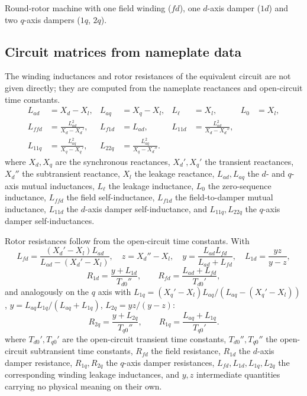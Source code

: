 \documentclass[11pt]{article}
\begin{document}
Round-rotor machine with one field winding ($fd$), one $d$-axis damper
($1d$) and two $q$-axis dampers ($1q$, $2q$).

\subsection{Circuit matrices from nameplate data}

The winding inductances and rotor resistances of the equivalent circuit are
not given directly; they are computed from the nameplate reactances and
open-circuit time constants.
\begin{align}
  L_{ad} &= X_d - X_l, & L_{aq} &= X_q - X_l, & L_\ell &= X_l, & L_0 &= X_l,\\
  L_{ffd} &= \frac{L_{ad}^2}{X_d - X_d'}, & L_{f1d} &= L_{ad}, &
  L_{11d} &= \frac{L_{ad}^2}{X_d - X_d''}, \\
  L_{11q} &= \frac{L_{aq}^2}{X_q - X_q'}, & L_{22q} &= \frac{L_{aq}^2}{X_q - X_d''}.
\end{align}
where $X_d,X_q$ are the synchronous reactances, $X_d',X_q'$ the transient
reactances, $X_d''$ the subtransient reactance, $X_l$ the leakage
reactance, $L_{ad},L_{aq}$ the $d$- and $q$-axis mutual inductances,
$L_\ell$ the leakage inductance, $L_0$ the zero-sequence inductance,
$L_{ffd}$ the field self-inductance, $L_{f1d}$ the field-to-damper mutual
inductance, $L_{11d}$ the $d$-axis damper self-inductance, and
$L_{11q},L_{22q}$ the $q$-axis damper self-inductances.

Rotor resistances follow from the open-circuit time constants. With
\begin{equation}
  L_{fd} = \frac{(X_d'-X_l)L_{ad}}{L_{ad}-(X_d'-X_l)},\quad
  z = X_d''-X_l,\quad
  y = \frac{L_{ad}L_{fd}}{L_{ad}+L_{fd}},\quad
  L_{1d} = \frac{yz}{y-z},
\end{equation}
\begin{equation}
  R_{1d} = \frac{y+L_{1d}}{T_{d0}''},\qquad
  R_{fd} = \frac{L_{ad}+L_{fd}}{T_{d0}'},
\end{equation}
and analogously on the $q$ axis with
$L_{1q}=(X_q'-X_l)L_{aq}/(L_{aq}-(X_q'-X_l))$, $y=L_{aq}L_{1q}/(L_{aq}+L_{1q})$,
$L_{2q}=yz/(y-z)$:
\begin{equation}
  R_{2q} = \frac{y+L_{2q}}{T_{q0}''},\qquad
  R_{1q} = \frac{L_{aq}+L_{1q}}{T_{q0}'} .
\end{equation}
where $T_{d0}',T_{q0}'$ are the open-circuit transient time constants,
$T_{d0}'',T_{q0}''$ the open-circuit subtransient time constants,
$R_{fd}$ the field resistance, $R_{1d}$ the $d$-axis damper resistance,
$R_{1q},R_{2q}$ the $q$-axis damper resistances, $L_{fd},L_{1d},L_{1q},L_{2q}$
the corresponding winding leakage inductances, and $y,z$ intermediate
quantities carrying no physical meaning on their own.
\end{document}
